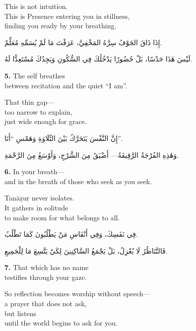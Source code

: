 \documentclass[11pt,a4paper,twoside]{book}
\begin{document}
This is not intuition.\\
This is Presence entering you in stillness,\\
finding you ready by your breathing.

\begin{flushright}
{\arabicfont
إِذَا ذَاقَ الجَوْفُ سِرَّهُ المَخْفِيَّ،
عَرَفْتَ مَا لَمْ يُسَمِّهِ مُعَلِّمٌ.

لَيْسَ هٰذَا حَدْسًا،
بَلْ حُضُورًا يَدْخُلُكَ فِي السُّكُونِ
وَيَجِدُكَ مُسْتَعِدًّا لَهُ.}
\end{flushright}

\vspace{1em}
{\color{indigo}\bfseries 5.}\quad
The self breathes\\
between recitation and the quiet ``I am''.

That thin gap—\\
too narrow to explain,\\
just wide enough for grace.

\begin{flushright}
{\arabicfont
إِنَّ النَّفْسَ يَتَحَرَّكُ بَيْنَ التِّلَاوَةِ وَهَمْسِ ``أَنَا''.

وَهٰذِهِ الفُرْجَةُ الرَّقِيقَةُ—
أَضْيَقُ مِنَ الشَّرْحِ، وَأَوْسَعُ مِنَ الرَّحْمَةِ.}
\end{flushright}

\vspace{1em}
{\color{indigo}\bfseries 6.}\quad
In your breath—\\
and in the breath of those who seek as you seek.

Tanāẓur never isolates.\\
It gathers in solitude\\
to make room for what belongs to all.

\begin{flushright}
{\arabicfont
فِي نَفَسِكَ، وَفِي أَنْفَاسِ مَنْ يَطْلُبُونَ كَمَا تَطْلُبُ.

فَالتَّنَاظُرُ لَا يُعْزِلُ،
بَلْ يَجْمَعُ السَّاكِنِينَ لِكَيْ يَتَّسِعَ مَا لِلْجَمِيعِ.}
\end{flushright}

\vspace{1em}
{\color{indigo}\bfseries 7.}\quad
That which has no name\\
testifies through your gaze.

So reflection becomes worship without speech—\\
a prayer that does not ask,\\
but listens\\
until the world begins to ask for you.
\end{document}
